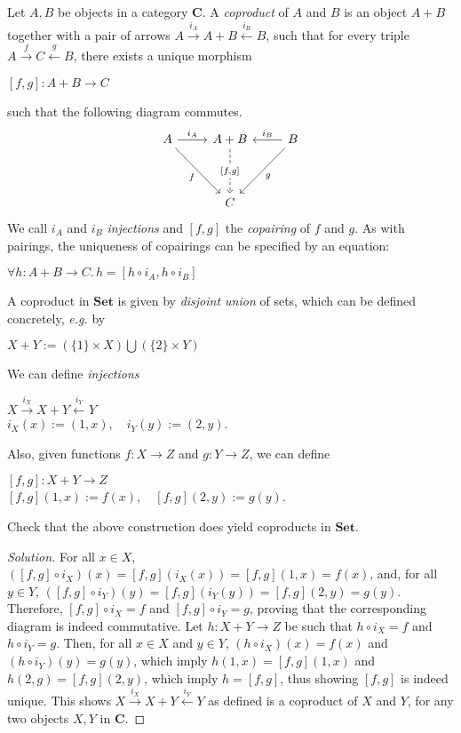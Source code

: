 \documentclass[]{amsbook}
\newcommand{\q}{\quad}
\newcommand{\catname}[1]{\mathbf{#1}}
\newcommand{\0}{\mathbf{0}}
\newcommand{\1}{\mathbf{1}}
\newenvironment{solution}
    {\begin{proof}[Solution]}{\end{proof}}
\begin{document}
Let $A, B$ be objects in a category $\catname{C}$. A \emph{coproduct} of $A$
and $B$ is an object $A + B$ together with a pair of arrows $A \xrightarrow{i_A}
A + B \xleftarrow{i_B} B$, such that for every triple $A \xrightarrow{f} C
\xleftarrow{g} B$, there exists a unique morphism
\begin{center}
    $[f, g]: A + B \to C$
\end{center}
such that the following diagram commutes.
\[
\begin{tikzcd}
    A \arrow[r, "i_A"] \arrow[ddr, swap, "f"] &
        A + B \arrow[dd, dashed, "{[f, g]}" description] &
        B \arrow[l, swap, "i_B"] \arrow[ddl, "g"] \\
    & & \\
    & C &
\end{tikzcd}
\]
We call $i_A$ and $i_B$ \emph{injections} and $[f, g]$ the \emph{copairing} of
$f$ and $g$. As with pairings, the uniqueness of copairings can be specified
by an equation:
\begin{center}
    $\forall h: A + B \to C.\, h = [h \circ i_A, h \circ i_B]$
\end{center}

\setcounter{Exercise}{31}
\begin{Exercise}
    A coproduct in $\catname{Set}$ is given by \emph{disjoint union} of sets,
    which can be defined concretely, \emph{e.g.} by
    \begin{center}
        $X + Y := (\{ 1 \} \times X) \bigcup (\{ 2 \} \times Y)$
    \end{center}
    We can define \emph{injections}
    \begin{center}
        $X \xrightarrow{i_X} X + Y \xleftarrow{i_Y} Y$\\
        $i_X(x) := (1, x), \q i_Y(y) := (2, y)$.
    \end{center}
    Also, given functions $f: X \to Z$ and $g: Y \to Z$, we can define
    \begin{center}
        $[f, g]: X + Y \to Z$\\
        $[f, g](1, x) := f(x), \q [f, g](2, y) := g(y)$.
    \end{center}
    Check that the above construction does yield coproducts in $\catname{Set}$.
\end{Exercise}
\begin{solution}
    For all $x \in X$, $([f, g] \circ i_X)(x) = [f, g](i_X(x)) = [f, g](1, x) =
    f(x)$, and, for all $y \in Y$, $([f, g] \circ i_Y)(y) = [f, g](i_Y(y)) =
    [f, g](2, y) = g(y)$. Therefore, $[f, g] \circ i_X = f$ and $[f, g] \circ
    i_Y = g$, proving that the corresponding diagram is indeed commutative. Let
    $h: X + Y \to Z$ be such that $h \circ i_X = f$ and $h \circ i_Y = g$. Then,
    for all $x \in X$ and $y \in Y$, $(h \circ i_X)(x) = f(x)$ and $(h \circ
    i_Y)(y) = g(y)$, which imply $h(1, x) = [f, g](1, x)$ and $h(2, g) = [f, g]
    (2, y)$, which imply $h = [f, g]$, thus showing $[f, g]$ is indeed unique.
    This shows $X \xrightarrow{i_X} X + Y \xleftarrow{i_Y} Y$ as defined is a
    coproduct of $X$ and $Y$, for any two objects $X, Y$ in $\catname{C}$.
\end{solution}
\end{document}
